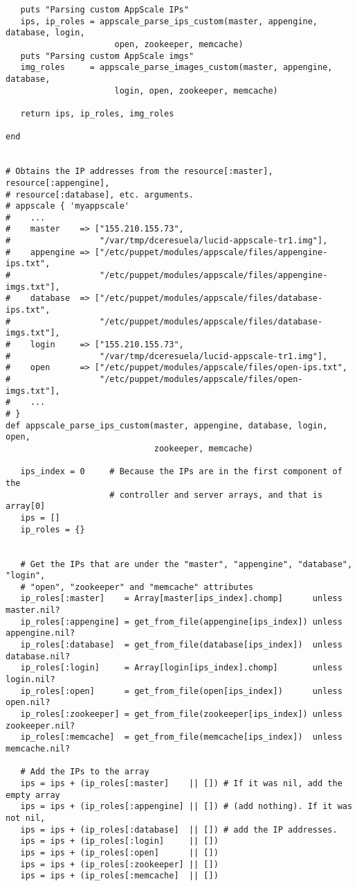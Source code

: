 \begin{lstlisting}
   puts "Parsing custom AppScale IPs"
   ips, ip_roles = appscale_parse_ips_custom(master, appengine, database, login,
                      open, zookeeper, memcache)
   puts "Parsing custom AppScale imgs"
   img_roles     = appscale_parse_images_custom(master, appengine, database,
                      login, open, zookeeper, memcache)
   
   return ips, ip_roles, img_roles

end


# Obtains the IP addresses from the resource[:master], resource[:appengine],
# resource[:database], etc. arguments.
# appscale { 'myappscale'
#    ...
#    master    => ["155.210.155.73",
#                  "/var/tmp/dceresuela/lucid-appscale-tr1.img"],
#    appengine => ["/etc/puppet/modules/appscale/files/appengine-ips.txt",
#                  "/etc/puppet/modules/appscale/files/appengine-imgs.txt"],
#    database  => ["/etc/puppet/modules/appscale/files/database-ips.txt",
#                  "/etc/puppet/modules/appscale/files/database-imgs.txt"],
#    login     => ["155.210.155.73",
#                  "/var/tmp/dceresuela/lucid-appscale-tr1.img"],
#    open      => ["/etc/puppet/modules/appscale/files/open-ips.txt",
#                  "/etc/puppet/modules/appscale/files/open-imgs.txt"],
#    ...
# }
def appscale_parse_ips_custom(master, appengine, database, login, open,
                              zookeeper, memcache)

   ips_index = 0     # Because the IPs are in the first component of the
                     # controller and server arrays, and that is array[0]
   ips = []
   ip_roles = {}

   
   # Get the IPs that are under the "master", "appengine", "database", "login",
   # "open", "zookeeper" and "memcache" attributes
   ip_roles[:master]    = Array[master[ips_index].chomp]      unless master.nil?
   ip_roles[:appengine] = get_from_file(appengine[ips_index]) unless appengine.nil?
   ip_roles[:database]  = get_from_file(database[ips_index])  unless database.nil?
   ip_roles[:login]     = Array[login[ips_index].chomp]       unless login.nil?
   ip_roles[:open]      = get_from_file(open[ips_index])      unless open.nil?
   ip_roles[:zookeeper] = get_from_file(zookeeper[ips_index]) unless zookeeper.nil?
   ip_roles[:memcache]  = get_from_file(memcache[ips_index])  unless memcache.nil?

   # Add the IPs to the array
   ips = ips + (ip_roles[:master]    || []) # If it was nil, add the empty array
   ips = ips + (ip_roles[:appengine] || []) # (add nothing). If it was not nil,
   ips = ips + (ip_roles[:database]  || []) # add the IP addresses.
   ips = ips + (ip_roles[:login]     || [])
   ips = ips + (ip_roles[:open]      || [])
   ips = ips + (ip_roles[:zookeeper] || [])
   ips = ips + (ip_roles[:memcache]  || [])
   

\end{lstlisting}
